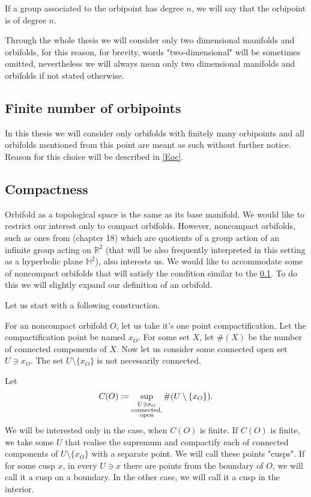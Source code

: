 If a group associated to the orbipoint has degree $n$, we will say that the orbipoint is 
of degree $n$.

Through the whole thesis we will consider only two dimensional manifolds and 
orbifolds, for this reason, for brevity, 
words "two-dimensional" will be sometimes omitted, nevertheless 
we will always mean only two dimensional manifolds and orbifolds if not stated otherwise. 
 
\subsection{Finite number of orbipoints}\label{finite number of orbipoints}
In this thesis we will consider only orbifolds with finitely many orbipoints and all orbifolds 
mentioned from this point are meant as such without further notice. Reason for this 
choice will be described in \ref{Eoc}.  

\subsection{Compactness}\label{compactness}
Orbifold as a topological space is the same as its base manifold.
We would like to restrict our interest only to compact orbifolds. 
However, noncompact orbifolds, such as ones from \cite{Conway2016} (chapter 18) 
which are quotients 
of a group action of an infinite group acting on $\mathbb{R}^2$ (that will 
be also frequently interpreted in this setting as a hyperbolic plane $\mathbb{H}^2$), 
also interests us. We would like to accommodate some of noncompact orbifolds that 
will satisfy the condition similar to the \ref{finite number of orbipoints}. 
To do this we will slightly expand our definition of an orbifold. 

Let us start with a following construction.

For an noncompact orbifold $O$, let us take it's one point compactification. 
Let the compactification point be named $x_O$.  
For some set $X$, let $\#(X)$ be the number of connected components of $X$.
Now let us consider some connected open set $U \ni x_O$. The set $U\setminus\{x_O\}$ is 
not necessarily connected.
 
Let 
\begin{equation}
C(O) \coloneqq \sup\limits_{\substack{U \ni x_O \\ \rm connected, \\ \rm open }} 
\#(U\setminus\{x_O\}).
\end{equation}
We will be interested only in the case, when $C(O)$ is finite.
If $C(O)$ is finite, we take some $U$ that realise the supremum and compactify each of 
connected components of $U\setminus\{x_O\}$ with a separate point. We will call these points 
"cusps". If for some cusp $x$, in every $U \ni x$ there are points from the boundary of $O$, 
we will call it a cusp on a boundary. In the other case, we will call it a cusp in the interior.


